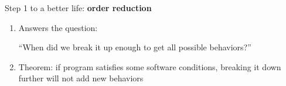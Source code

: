 \documentclass{beamer}
\begin{document}

\begin{frame}
Step 1 to a better life: \textbf{order reduction}

\begin{enumerate} 
	\item Answers the question: 
	
	\begin{center}
		``When did we break it up enough to get all possible behaviors?''
	\end{center}
	\item Theorem: if program satisfies some software conditions, breaking it down further will not add new behaviors
\end{enumerate}
\end{frame}
\end{document}
